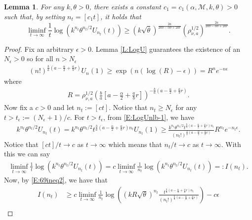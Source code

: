 \documentclass[a4paper,11pt]{article}
\numberwithin{equation}{section}
\numberwithin{equation}{section}
\theoremstyle{plain}
\newtheorem{lemma}[theorem]{Lemma}
\theoremstyle{definition}
\begin{document}
\begin{lemma} \label{L:logUnlb}
  For any $k,\theta >0$, there exists a constant $c_1 = c_1(\alpha,\mathcal{M}, k, \theta) >0$ such
  that, by setting $n_t = [c_1 t]$, it holds that
  \begin{equation}\label{E:69ineq}
    \liminf_{t \to \infty} \frac{1}{t} \log( k^{n_t} \theta^{n_t/2}U_{n_t}(t)) \ge
    \left( k \sqrt{\theta} \right)^{\frac{2a}{2ab-\alpha b + 2ar}} \left( \rho_{\nu,a}^{1/2} \right)^{\frac{2a}{2ab-\alpha b + 2ar}}.
  \end{equation}
\end{lemma}
\begin{proof}
  Fix an arbitrary $\epsilon > 0$. Lemma \ref{L:LogU} guarantees the existence of an $N_\epsilon >0$
  so for all $n>N_\epsilon$
  \begin{align} \label{E:LogUnlb-1}
    (n!)^{\frac{b}{a}\left( a - \frac{\alpha}{2} + \frac{a}{b}r \right)} U_n(1) \ge \exp\left( n(\log(R)-\epsilon) \right) = R^n e^{-n\epsilon }
  \end{align}
  where
  \begin{align*}
    R = \rho_{\nu,a}^{1/2}  \left( \frac{b}{a}\left[ a - \frac{\alpha}{2} + \frac{a}{b}r \right ] \right)^{- \frac{b}{a}\left( a - \frac{\alpha}{2} + \frac{a}{b}r \right) }.
  \end{align*}
  Now fix a $c>0$ and let $n_t := [ct]$. Notice that $n_t \ge N_\epsilon$ for any $t>t_\epsilon :=
  (N_\epsilon +1)/c$.  For $t > t_\epsilon$, from \eqref{E:LogUnlb-1}, we have
  \begin{align} \label{E:69ineq2}
        k^{n_t}\theta^{n_t/2}U_{n_t}(t)
    =   k^{n_t} \theta^{n_t/2} t^{\frac{b}{a} \left( a-\frac{\alpha}{2} + \frac{a}{b}r \right)n_t } U_{n_t}(1)
    \ge \frac{ k^{n_t} \theta^{n_t/2} t^{\frac{b}{a} \left( a-\frac{\alpha}{2} + \frac{a}{b}r \right)n_t } }{ (n_t!)^{\frac{b}{a} \left(a-\frac{\alpha}{2} +\frac{a}{b}r \right)} } R^{n_t}e^{-n_t \epsilon}.
  \end{align}
  Notice that $[ct]/t \to c$ as $t \to \infty$ which means that $n_t/t \to c$ as $t \to \infty$.
  With this we can say
  \begin{align*}
      \liminf_{t \to \infty} \frac{1}{t} \log \left( k^{n_t} \theta^{n_t/2} U_{n_t}(t) \right)
    = c \liminf_{t\to \infty} \frac{1}{n_t} \log \left( k^{n_t} \theta^{n_t/2} U_{n_t}(t) \right)
    = : I(n_t).
  \end{align*}
  Now, by \eqref{E:69ineq2}, we have that
  \begin{align*}
    I(n_t) & \ge c \liminf_{t\to \infty} \frac{1}{n_t} \log \left( (kR\sqrt{\theta})^{n_t} \frac{ t^{\frac{b}{a} \left( a-\frac{\alpha}{2} + \frac{a}{b}r \right)n_t } }{ (n_t!)^{\frac{b}{a}\left( a -\frac{\alpha}{2} + \frac{a}{b}r \right) }  }\right) - c\epsilon                                                                                                  \\

\end{align*}
\end{proof}
\end{document}
